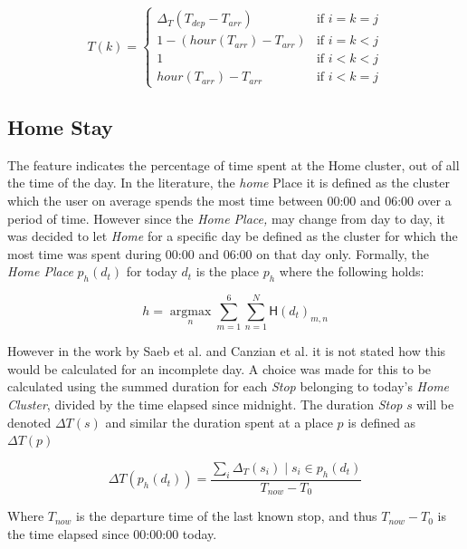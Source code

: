 \begin{equation}
\label{eq:feature-hour-computaion3}
T(k) =
\begin{cases}
    \Delta_T (T_{dep} - T_{arr})    & \text{if $i = k = j$} \\
    1 - (hour(T_{arr}) - T_{arr})   & \text{if $i = k < j$} \\
    1                               & \text{if $i < k < j$} \\
    hour(T_{arr}) - T_{arr}         & \text{if $i < k = j$}
\end{cases}
\end{equation}


\subsection{Home Stay}
The  feature indicates the percentage of time spent at the Home cluster, out of all the time of the day. In the literature, the \textit{home} Place it is defined as the cluster which the user on average spends the most time between 00:00 and 06:00 over a period of time. However since the \textit{Home Place,} may change from day to day, it was decided to let \textit{Home} for a specific day be defined as the cluster for which the most time was spent during 00:00 and 06:00 on that day only. Formally, the \textit{Home Place} $p_h (d_t)$ for today $d_t$ is the place $p_h$ where the following holds:

\begin{equation}
\label{eq:feature-home-place}
h = \operatorname*{argmax}_n \sum_{m=1}^{6} \sum_{n=1}^{N}  \mathsf{H}(d_t)_{m,n}
\end{equation}

However in the work by Saeb et al. \cite{Saeb2015} and Canzian et al.\cite{Canzian2015} it is not stated how this would be calculated for an incomplete day. A choice was made for this to be calculated using the summed duration for each \textit{Stop} belonging to today's \textit{Home Cluster}, divided by the time elapsed since midnight. The duration \textit{Stop} $s$ will be denoted $\Delta T (s)$ and similar the duration spent at a place $p$ is defined as $\Delta T (p)$

\begin{equation}
\label{eq:feature-home-place}
\Delta T(p_{h} (d_t) )= \frac{\sum_i \Delta_T (s_i) \;|\; s_i \in p_h (d_t)}{T_{now} - T_{0}}
\end{equation}

Where $T_{now}$ is the departure time of the last known stop, and thus $T_{now} - T_0$ is the time elapsed since 00:00:00 today.

